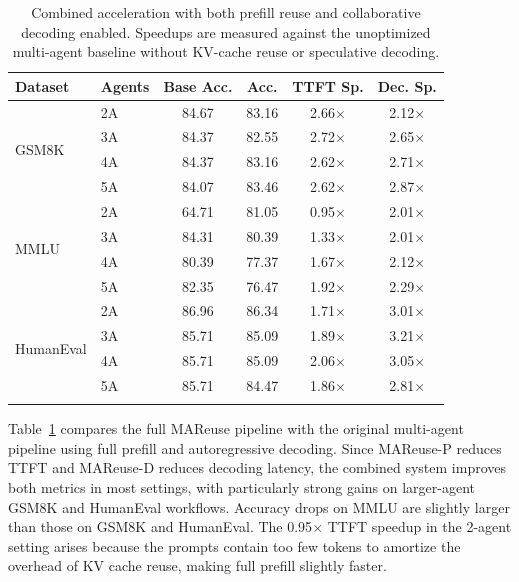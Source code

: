 \documentclass[letterpaper]{article} %
\newcommand{\thickhline}{\noalign{\hrule height 0.8pt}}
\begin{document}
\begin{table}[t]
\centering
\small
\setlength{\tabcolsep}{3.6pt}
\begin{tabular}{llcccc}
\thickhline
\textbf{Dataset} & \textbf{Agents} & \textbf{Base Acc.} & \textbf{Acc.} & \textbf{TTFT Sp.} & \textbf{Dec. Sp.} \\
\hline
\multirow{4}{*}{GSM8K} & 2A & 84.67 & 83.16 & 2.66$\times$ & 2.12$\times$ \\
 & 3A & 84.37 & 82.55 & 2.72$\times$ & 2.65$\times$ \\
 & 4A & 84.37 & 83.16 & 2.62$\times$ & 2.71$\times$ \\
 & 5A & 84.07 & 83.46 & 2.62$\times$ & 2.87$\times$ \\
\hline
\multirow{4}{*}{MMLU} & 2A & 64.71 & 81.05 & 0.95$\times$ & 2.01$\times$ \\
 & 3A & 84.31 & 80.39 & 1.33$\times$ & 2.01$\times$ \\
 & 4A & 80.39 & 77.37 & 1.67$\times$ & 2.12$\times$ \\
 & 5A & 82.35 & 76.47 & 1.92$\times$ & 2.29$\times$ \\
\hline
\multirow{4}{*}{HumanEval} & 2A & 86.96 & 86.34 & 1.71$\times$ & 3.01$\times$ \\
 & 3A & 85.71 & 85.09 & 1.89$\times$ & 3.21$\times$ \\
 & 4A & 85.71 & 85.09 & 2.06$\times$ & 3.05$\times$ \\
 & 5A & 85.71 & 84.47 & 1.86$\times$ & 2.81$\times$ \\
\thickhline
\end{tabular}
\caption{Combined acceleration with both prefill reuse and collaborative decoding enabled. Speedups are measured against the unoptimized multi-agent baseline without KV-cache reuse or speculative decoding.}
\label{tab:combined-results}
\end{table}

Table~\ref{tab:combined-results} compares the full MAReuse pipeline with the original multi-agent pipeline using full prefill and autoregressive decoding. Since MAReuse-P reduces TTFT and MAReuse-D reduces decoding latency, the combined system improves both metrics in most settings, with particularly strong gains on larger-agent GSM8K and HumanEval workflows. Accuracy drops on MMLU are slightly larger than those on GSM8K and HumanEval. The 0.95$\times$ TTFT speedup in the 2-agent setting arises because the prompts contain too few tokens to amortize the overhead of KV cache reuse, making full prefill slightly faster.
\end{document}
